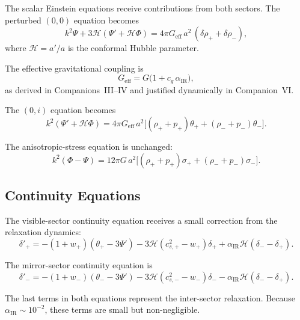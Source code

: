 \documentclass[11pt,a4paper]{article}
\begin{document}
The scalar Einstein equations receive contributions from both sectors. The perturbed $(0,0)$
equation becomes
\begin{equation}
    k^{2}\Psi + 3\mathcal{H}(\Psi' + \mathcal{H}\Phi)
    = 4\pi G_{\mathrm{eff}}\,a^{2}\,(\delta\rho_{+} + \delta\rho_{-}),
\end{equation}
where $\mathcal{H} = a'/a$ is the conformal Hubble parameter.

The effective gravitational coupling is
\begin{equation}
    G_{\mathrm{eff}} = G\bigl(1 + c_{g}\,\alpha_{\mathrm{IR}}\bigr),
\end{equation}
as derived in Companions~III–IV and justified dynamically in Companion~VI.

The $(0,i)$ equation becomes
\begin{equation}
    k^{2}(\Psi' + \mathcal{H}\Phi)
    = 4\pi G_{\mathrm{eff}}\,a^{2}\bigl[(\rho_{+}+p_{+})\theta_{+}
    + (\rho_{-}+p_{-})\theta_{-}\bigr].
\end{equation}

The anisotropic-stress equation is unchanged:
\begin{equation}
    k^{2}(\Phi - \Psi)
    = 12\pi G\,a^{2}\bigl[(\rho_{+}+p_{+})\sigma_{+}
    + (\rho_{-}+p_{-})\sigma_{-}\bigr].
\end{equation}

\subsection{Continuity Equations}

The visible-sector continuity equation receives a small correction from the relaxation dynamics:
\begin{equation}
    \delta'_{+}
    = - (1+w_{+})(\theta_{+} - 3\Psi')
      - 3\mathcal{H}(c_{s,+}^{2} - w_{+})\delta_{+}
      + \alpha_{\mathrm{IR}}\mathcal{H}(\delta_{-} - \delta_{+}).
\end{equation}

The mirror-sector continuity equation is
\begin{equation}
    \delta'_{-}
    = - (1+w_{-})(\theta_{-} - 3\Psi')
      - 3\mathcal{H}(c_{s,-}^{2} - w_{-})\delta_{-}
      - \alpha_{\mathrm{IR}}\mathcal{H}(\delta_{-} - \delta_{+}).
\end{equation}

The last terms in both equations represent the inter-sector relaxation. Because
$\alpha_{\mathrm{IR}} \sim 10^{-2}$, these terms are small but non-negligible.
\end{document}
